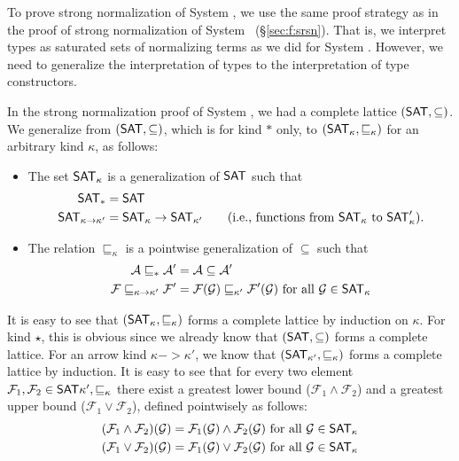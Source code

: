 To prove strong normalization of System \F, we use the same proof strategy
as in the proof of strong normalization of System \F\ (\S\ref{sec:f:srsn}).
That is, we interpret types as saturated sets of normalizing terms as we did
for System \F. However, we need to generalize the interpretation of types to
the interpretation of type constructors.

In the strong normalization proof of
System \F, we had a complete lattice $(\mathsf{SAT},\subseteq)$. We generalize from
$(\mathsf{SAT},\subseteq)$, which is for kind $*$ only, to
$(\mathsf{SAT}_\kappa,\sqsubseteq_\kappa)$ for an arbitrary kind $\kappa$,
as follows:
\begin{itemize}
\item The set $\mathsf{SAT}_\kappa$ is a generalization of $\mathsf{SAT}$ such that
\begin{align*}
        \mathsf{SAT}_{*} &= \mathsf{SAT} \\
        \mathsf{SAT}_{\kappa -> \kappa'} &= \mathsf{SAT}_\kappa -> \mathsf{SAT}_{\kappa'}
        \qquad \text{({i.e.}, functions from $\mathsf{SAT}_\kappa$ to $\mathsf{SAT}_\kappa'$)}.
\end{align*}

\item The relation $\sqsubseteq_\kappa$ is
        a pointwise generalization of $\subseteq$ such that
\begin{align*}
\mathcal{A} \sqsubseteq_{*} \mathcal{A'} &= \mathcal{A} \subseteq \mathcal{A'}\\
\mathcal{F} \sqsubseteq_{\kappa -> \kappa'} \mathcal{F'} &=
        \mathcal{F}(\mathcal{G}) \sqsubseteq_{\kappa'} \mathcal{F'}(\mathcal{G})
        ~\text{for all}~\mathcal{G}\in\mathsf{SAT}_\kappa
\end{align*}
\end{itemize}
It is easy to see that $(\mathsf{SAT}_\kappa,\sqsubseteq_\kappa)$ forms
a complete lattice by induction on $\kappa$. For kind $\star$,
this is obvious since we already know that $(\mathsf{SAT},\subseteq)$ forms
a complete lattice. For an arrow kind $\kappa -> \kappa'$, we know that
$(\mathsf{SAT}_{\kappa'},\sqsubseteq_{\kappa})$ forms a complete lattice by induction.
It is easy to see that for every two element $\mathcal{F}_1, \mathcal{F}_2
\in \mathsf{SAT}{\kappa'},\sqsubseteq_{\kappa}$ there exist a greatest lower bound
($\mathcal{F}_1 \wedge \mathcal{F}_2$) and a greatest upper bound 
($\mathcal{F}_1 \vee \mathcal{F}_2$), defined pointwisely as follows:
\begin{align*}
(\mathcal{F}_1 \wedge \mathcal{F}_2)(\mathcal{G}) &=
   \mathcal{F}_1(\mathcal{G}) \wedge \mathcal{F}_2(\mathcal{G})
        ~\text{for all}~\mathcal{G}\in\mathsf{SAT}_\kappa \\
(\mathcal{F}_1 \vee \mathcal{F}_2)(\mathcal{G}) &=
   \mathcal{F}_1(\mathcal{G}) \vee \mathcal{F}_2(\mathcal{G})
        ~\text{for all}~\mathcal{G}\in\mathsf{SAT}_\kappa
\end{align*}
